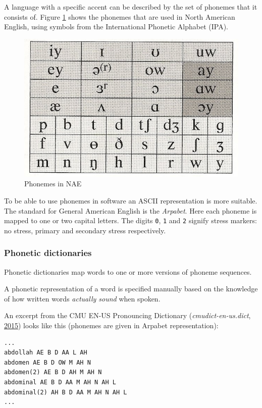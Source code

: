 \documentclass[]{article}
\begin{document}
A language with a specific accent can be described by the set of
phonemes that it consists of. Figure \ref{phonemic-chart} shows the
phonemes that are used in North American English, using symbols from the
International Phonetic Alphabet (IPA).

\begin{figure}[htbp]
\centering
\includegraphics{images/nae-phonemes.jpg}
\caption{Phonemes in NAE\label{phonemic-chart}}
\end{figure}

To be able to use phonemes in software an ASCII representation is more
suitable. The standard for General American English is the
\emph{Arpabet}. Here each phoneme is mapped to one or two capital
letters. The digits \texttt{0}, \texttt{1} and \texttt{2} signify stress
markers: no stress, primary and secondary stress respectively.

\subsubsection{Phonetic dictionaries}\label{phonetic-dictionaries}

Phonetic dictionaries map words to one or more versions of phoneme
sequences.

A phonetic representation of a word is specified manually based on the
knowledge of how written words \emph{actually sound} when spoken.

An excerpt from the CMU EN-US Pronouncing Dictionary
(\emph{cmudict-en-us.dict}, \hyperref[ref-cmuDict]{2015}) looks like
this (phonemes are given in Arpabet representation):

\begin{verbatim}
...
abdollah AE B D AA L AH
abdomen AE B D OW M AH N
abdomen(2) AE B D AH M AH N
abdominal AE B D AA M AH N AH L
abdominal(2) AH B D AA M AH N AH L
...
\end{verbatim}
\end{document}
